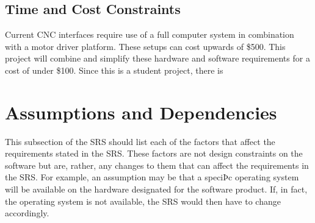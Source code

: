 \subsection{Time and Cost Constraints}
Current CNC interfaces require use of a full computer system in combination with a motor driver platform.
These setups can cost upwards of \$500.
This project will combine and simplify these hardware and software requirements for a cost of under \$100.
Since this is a student project, there is 

\section{Assumptions and Dependencies}
This subsection of the SRS should list each of the factors that affect the requirements stated in the SRS.
These factors are not design constraints on the software but are, rather, any changes to them that can affect
the requirements in the SRS. For example, an assumption may be that a speciÞc operating system will be
available on the hardware designated for the software product. If, in fact, the operating system is not available,
the SRS would then have to change accordingly.